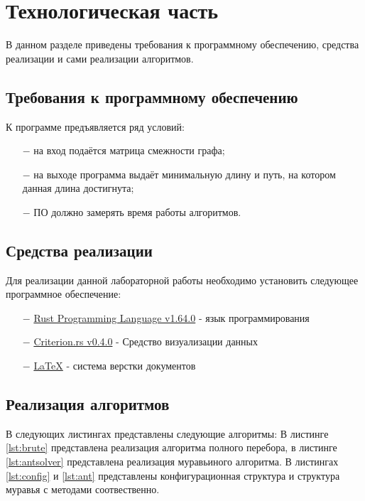 \chapter{Технологическая часть}

В данном разделе приведены требования к программному обеспечению, средства реализации и сами реализации алгоритмов.

\section{Требования к программному обеспечению}
К программе предъявляется ряд условий:
\begin{itemize}
    \item[$-$] на вход подаётся матрица смежности графа;
    \item[$-$] на выходе программа выдаёт минимальную длину и путь, на котором данная длина достигнута;
    \item[$-$] ПО должно замерять время работы алгоритмов.
\end{itemize}

\section{Средства реализации}
Для реализации данной лабораторной работы необходимо установить следующее программное обеспечение:
\begin{itemize}
    \item[$-$] \href{https://www.rust-lang.org/}{Rust Programming Language v1.64.0} - язык программирования\cite{Rust}
    \item[$-$] \href{https://github.com/bheisler/criterion.rs}{Criterion.rs v0.4.0} - Средство визуализации данных
    \item[$-$] \href{https://www.latex-project.org/}{LaTeX} - система верстки документов
\end{itemize}

\section{Реализация алгоритмов}
В следующих листингах представлены следующие алгоритмы:
В листинге \ref{lst:brute} представлена реализация алгоритма полного перебора, в листинге \ref{lst:antsolver} представлена реализация муравьиного алгоритма. В листингах \ref{lst:config} и \ref{lst:ant} представлены конфигурационная структура и структура муравья с методами соотвественно.

    \clearpage


